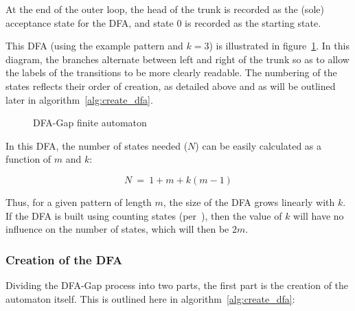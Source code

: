 At the end of the outer loop, the head of the trunk is recorded as the (sole) acceptance state for the DFA, and state 0 is recorded as the starting state.

This DFA (using the example pattern and $k=3$) is illustrated in figure~\ref{fig:dfa_dfa}. In this diagram, the branches alternate between left and right of the trunk so as to allow the labels of the transitions to be more clearly readable. The numbering of the states reflects their order of creation, as detailed above and as will be outlined later in algorithm~\ref{alg:create_dfa}.

\begin{figure}[ht]
\centering

\caption{DFA-Gap finite automaton}
\label{fig:dfa_dfa}
\end{figure}

In this DFA, the number of states needed ($N$) can be easily calculated as a function of $m$ and $k$:

\[N~=~1 + m + k(m - 1)\]

Thus, for a given pattern of length $m$, the size of the DFA grows linearly with $k$. If the DFA is built using counting states (per~\cite{becchi.crowley.2008}), then the value of $k$ will have no influence on the number of states, which will then be $2m$.

\subsubsection{Creation of the DFA}

Dividing the DFA-Gap process into two parts, the first part is the creation of the automaton itself. This is outlined here in algorithm~\ref{alg:create_dfa}:

